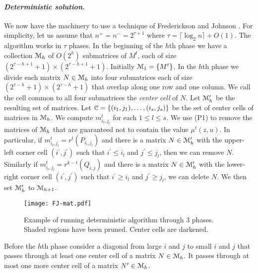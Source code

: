 \documentclass[11pt]{myclass}
\newcommand{\EuM}{\ensuremath{\EuScript{M}}}
\newcommand{\EuC}{\ensuremath{\EuScript{C}}}
\begin{document}
\paragraph{\textbf{\emph{Deterministic solution.}}}
We now have the machinery to use a technique of Frederickson and Johnson \cite{FJ82}.  
For simplicity, let us assume that $n^+ = n^- = 2^{\tau+1}$ where $\tau  = \lceil \log_2 n \rceil + O(1)$.  The algorithm works in $\tau$ phases.
In the beginning of the $h$th phase we have a collection $\EuM_h$ of $O(2^h)$ submatrices of $M^t$, each of size $(2^{\tau - h+1} + 1) \times (2^{\tau-h+1} + 1)$.  Initially $\EuM_1 = \{M^t\}$.  In the $h$th phase we divide each matrix $N \in \EuM_h$ into four submatrices each of size $(2^{\tau-h} + 1) \times (2^{\tau-h} + 1)$ that overlap along one row and one column.  We call the cell common to all four submatrices the \emph{center cell} of $N$.  Let $\EuM_h^\prime$ be the resulting set of matrices.  Let $\EuC = \{ (i_1, j_1), \ldots, (i_s, j_s)\}$ be the set of center cells of matrices in $\EuM_h$.  We compute $m^t_{i_l, j_l}$ for each $1 \leq l \leq s$.  We use (P1) to remove the matrices of $\EuM_h$ that are guaranteed not to contain the value $\mu^t(z,u)$.  
In particular, if $m^t_{i_l,j_l} = r^t(P_{i_l,j_l})$ and there is a matrix $N \in \EuM^\prime_h$ with the upper-left corner cell $(i^\prime, j^\prime)$ such that $i^\prime \leq i_l$ and $j^\prime \leq j_l$, then we can remove $N$.  
Similarly if $m^t_{i_l,j_l} = r^{k-t}(Q_{i,j})$ and there is a matrix $N \in \EuM^\prime_h$ with the lower-right corner cell $(i^\prime,j^\prime)$ such that $i^\prime \geq i_l$ and $j^\prime \geq j_l$, we can delete $N$. 
We then set $\EuM^\prime_h$ to $\EuM_{h+1}$. 

\begin{figure}[h]
\center
\texttt{[image: FJ-mat.pdf]}
\caption{\label{fig:FJ-mat}
Example of running deterministic algorithm through 3 phases.  Shaded regions have been pruned.  Center cells are darkened.  
}
\end{figure}

\begin{lemma}
Before the $h$th phase consider a diagonal from large $i$ and $j$ to small $i$ and $j$ that passes through at least one center cell of a matrix $N \in \EuM_h$.  It passes through at most one more center cell of a matrix $N^\prime \in \EuM_h$.  
\label{lem:diag-center}
\end{lemma}
\end{document}
